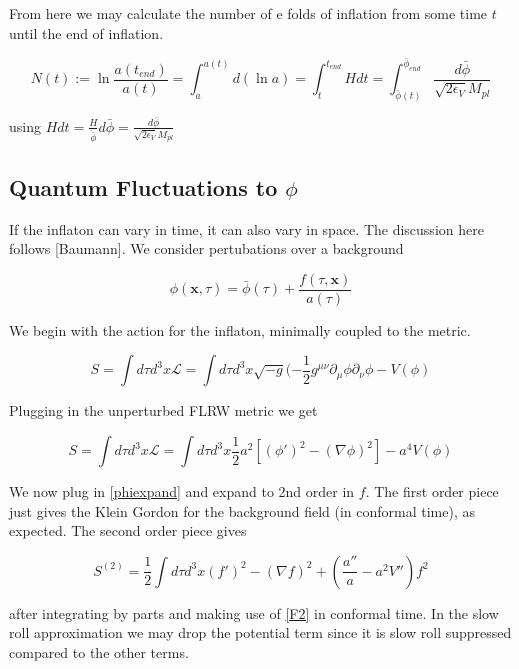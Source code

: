 \documentclass[a4paper,10pt]{article}
\renewcommand{\v}[1]{\mathbf{#1}}
\newcommand{\Mp}{M_{pl}}
\newcommand{\half}{\frac{1}{2}}
\newcommand{\bphi}{\bar{\phi}}
\begin{document}
From here we may calculate the number of e folds of inflation from some time $t$ until the end of inflation. 

\begin{equation}
N(t) := \ln{\frac{a(t_{end})}{a(t)}} = \int_a^{a(t)} d(\ln{a}) = \int_t^{t_{end}} Hdt = \int_{\bphi(t)}^{\bphi_{end}} \frac{d\bphi}{\sqrt{2\epsilon_V}\Mp}
\label{efolds}
\end{equation}

using $Hdt=\frac{H}{\dot{\bphi}}d\bphi=\frac{d\bphi}{\sqrt{2\epsilon_V}\Mp}$

\subsection{Quantum Fluctuations to $\phi$}

If the inflaton can vary in time, it can also vary in space. The discussion here follows [Baumann]. We consider pertubations over a background

\begin{equation}
\phi(\v{x},\tau) = \bphi(\tau) + \frac{f(\tau, \v{x})}{a(\tau)}
\label{phiexpand}
\end{equation}

We begin with the action for the inflaton, minimally coupled to the metric.

\begin{equation}
S =\int d\tau d^3x \mathcal{L}  =  \int d\tau d^3x \sqrt{-g} (-\half g^{\mu \nu}\partial_\mu \phi\partial_\nu \phi - V(\phi)  
\end{equation}

Plugging in the unperturbed FLRW metric we get 


\begin{equation}
S = \int d\tau d^3x \mathcal{L}  = \int d\tau d^3x \half a^2 [(\phi ' )^2 -(\nabla \phi)^2]-a^4V(\phi)
\label{scalarfieldaction}
\end{equation}

We now plug in \ref{phiexpand} and expand to 2nd order in $f$. The first order piece just gives the Klein Gordon for the background field (in conformal time), as expected. The second order piece gives

\begin{equation}
S^{(2)} = \half \int d\tau d^3x (f')^2 - (\nabla f)^2 + (\frac{a''}{a}-a^2V'')f^2
\end{equation}

after integrating by parts and making use of \ref{F2} in conformal time. In the slow roll approximation we may drop the potential term since it is slow roll suppressed compared to the other terms.
\end{document}
